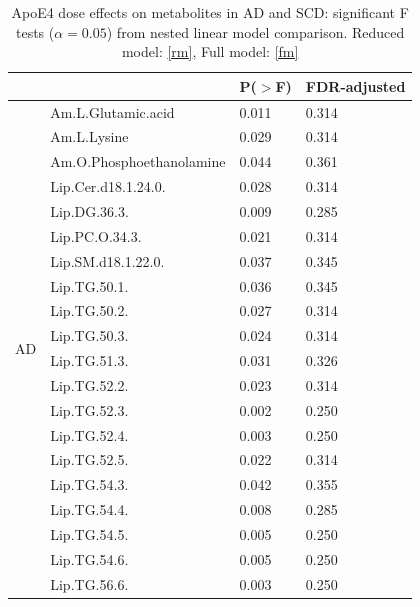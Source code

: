 \documentclass{amsart}
\begin{document}
\begin{table}[H]
\caption{ApoE4 dose effects on metabolites in AD and SCD: significant F tests ($\alpha=0.05$) from nested linear model comparison. Reduced model: \eqref{rm}, Full model: \eqref{fm}}
\label{tab:nestedF}
\begin{tabular}{clll} \toprule
&                           & P($>$F) & FDR-adjusted \\ \midrule
\multirow{29}{*}{AD} & Am.L.Glutamic.acid        & 0.011              & 0.314        \\
& Am.L.Lysine                & 0.029              & 0.314        \\
& Am.O.Phosphoethanolamine      & 0.044              & 0.361        \\
& Lip.Cer.d18.1.24.0.           & 0.028              & 0.314        \\
& Lip.DG.36.3.                  & 0.009              & 0.285        \\
& Lip.PC.O.34.3.                & 0.021              & 0.314        \\
& Lip.SM.d18.1.22.0.            & 0.037              & 0.345        \\
& Lip.TG.50.1.                  & 0.036              & 0.345        \\
& Lip.TG.50.2.                  & 0.027              & 0.314        \\
& Lip.TG.50.3.                  & 0.024              & 0.314        \\
& Lip.TG.51.3.                  & 0.031              & 0.326        \\
& Lip.TG.52.2.                  & 0.023              & 0.314        \\
& Lip.TG.52.3.                  & 0.002              & 0.250        \\
& Lip.TG.52.4.                  & 0.003              & 0.250        \\
& Lip.TG.52.5.                  & 0.022              & 0.314        \\
& Lip.TG.54.3.                  & 0.042              & 0.355        \\
& Lip.TG.54.4.                  & 0.008              & 0.285        \\
& Lip.TG.54.5.                  & 0.005              & 0.250        \\
& Lip.TG.54.6.                  & 0.005              & 0.250        \\
& Lip.TG.56.6.                  & 0.003              & 0.250        \\

\end{tabular}
\end{table}
\end{document}
